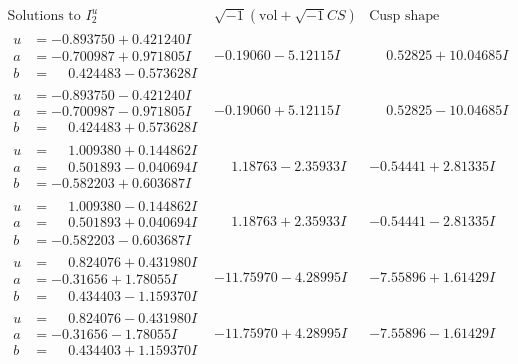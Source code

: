 \documentclass[1p]{elsarticle_modified}
\theoremstyle{definition}
\newcommand{\I}{\sqrt{-1}}
\begin{document}
$$\begin{array}{c|c|c}  
\text{Solutions to }I^u_{2}& \I (\text{vol} + \sqrt{-1}CS) & \text{Cusp shape}\\
 \hline 
\begin{aligned}
u &= -0.893750 + 0.421240 I \\
a &= -0.700987 + 0.971805 I \\
b &= \phantom{-}0.424483 - 0.573628 I\end{aligned}
 & -0.19060 - 5.12115 I & \phantom{-}0.52825 + 10.04685 I \\ \hline\begin{aligned}
u &= -0.893750 - 0.421240 I \\
a &= -0.700987 - 0.971805 I \\
b &= \phantom{-}0.424483 + 0.573628 I\end{aligned}
 & -0.19060 + 5.12115 I & \phantom{-}0.52825 - 10.04685 I \\ \hline\begin{aligned}
u &= \phantom{-}1.009380 + 0.144862 I \\
a &= \phantom{-}0.501893 - 0.040694 I \\
b &= -0.582203 + 0.603687 I\end{aligned}
 & \phantom{-}1.18763 - 2.35933 I & -0.54441 + 2.81335 I \\ \hline\begin{aligned}
u &= \phantom{-}1.009380 - 0.144862 I \\
a &= \phantom{-}0.501893 + 0.040694 I \\
b &= -0.582203 - 0.603687 I\end{aligned}
 & \phantom{-}1.18763 + 2.35933 I & -0.54441 - 2.81335 I \\ \hline\begin{aligned}
u &= \phantom{-}0.824076 + 0.431980 I \\
a &= -0.31656 + 1.78055 I \\
b &= \phantom{-}0.434403 - 1.159370 I\end{aligned}
 & -11.75970 - 4.28995 I & -7.55896 + 1.61429 I \\ \hline\begin{aligned}
u &= \phantom{-}0.824076 - 0.431980 I \\
a &= -0.31656 - 1.78055 I \\
b &= \phantom{-}0.434403 + 1.159370 I\end{aligned}
 & -11.75970 + 4.28995 I & -7.55896 - 1.61429 I \\ \hline\begin{aligned}

\end{aligned}
\end{array}$$
\end{document}
